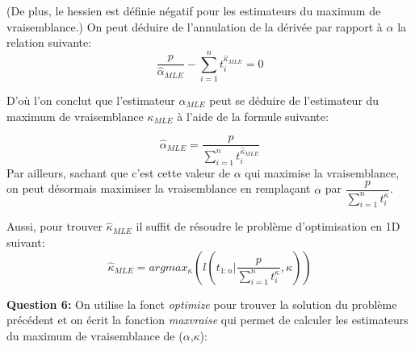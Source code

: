 \documentclass[
]{article}
\newenvironment{Shaded}{\begin{snugshade}}{\end{snugshade}}
\newcommand{\ControlFlowTok}[1]{\textcolor[rgb]{0.13,0.29,0.53}{\textbf{#1}}}
\newcommand{\DataTypeTok}[1]{\textcolor[rgb]{0.13,0.29,0.53}{#1}}
\newcommand{\DecValTok}[1]{\textcolor[rgb]{0.00,0.00,0.81}{#1}}
\newcommand{\KeywordTok}[1]{\textcolor[rgb]{0.13,0.29,0.53}{\textbf{#1}}}
\newcommand{\NormalTok}[1]{#1}
\newcommand{\OperatorTok}[1]{\textcolor[rgb]{0.81,0.36,0.00}{\textbf{#1}}}
\newcommand{\OtherTok}[1]{\textcolor[rgb]{0.56,0.35,0.01}{#1}}
\newcommand{\StringTok}[1]{\textcolor[rgb]{0.31,0.60,0.02}{#1}}
\begin{document}
(De plus, le hessien est définie négatif pour les estimateurs du maximum
de vraisemblance.) On peut déduire de l'annulation de la dérivée par
rapport à \(\alpha\) la relation suivante:
\[\dfrac{p}{\hat{\alpha}_{MLE}} - \sum_{i = 1}^{n} t_{i}^{\hat{\kappa}_{MLE}} = 0\]

D'où l'on conclut que l'estimateur \(\alpha_{MLE}\) peut se déduire de
l'estimateur du maximum de vraisemblance \(\kappa_{MLE}\) à l'aide de la
formule suivante:

\[\hat{\alpha}_{MLE} = \dfrac{p}{\sum_{i = 1}^{n} t_{i}^{\hat{\kappa}_{MLE}}}\]
Par ailleurs, sachant que c'est cette valeur de \(\alpha\) qui maximise
la vraisemblance, on peut désormais maximiser la vraisemblance en
remplaçant \(\alpha\) par
\(\dfrac{p}{\sum_{i = 1}^{n} t_{i}^{\kappa}}\).

Aussi, pour trouver \(\hat{\kappa}_{MLE}\) il suffit de résoudre le
problème d'optimisation en 1D suivant:
\[\hat{\kappa}_{MLE}=argmax_{\kappa}(l(t_{1:n}| \dfrac{p}{\sum_{i = 1}^{n} t_{i}^{\kappa}},\kappa))\]

\textbf{Question 6:} On utilise la fonct \emph{optimize} pour trouver la
solution du problème précédent et on écrit la fonction \emph{maxvraise}
qui permet de calculer les estimateurs du maximum de vraisemblance de
(\(\alpha\),\(\kappa\)):

\begin{Shaded}
\end{Shaded}
\end{document}

